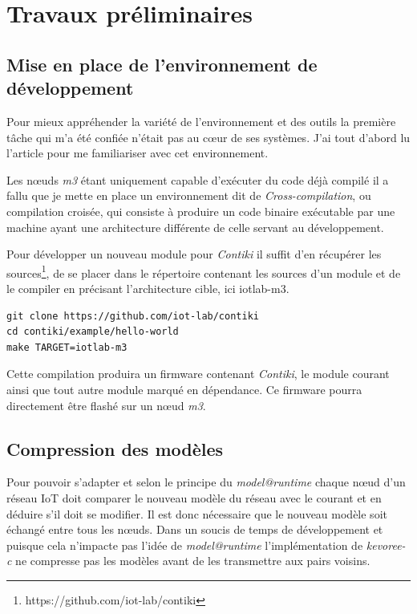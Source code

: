 \section{Travaux préliminaires}
\subsection{Mise en place de l'environnement de développement}
Pour mieux appréhender la variété de l'environnement et des outils la première tâche qui m'a été confiée n'était pas au cœur de ses systèmes. J'ai tout d'abord lu l'article \citep{acostapadilla} pour me familiariser avec cet environnement. 

Les nœuds \emph{m3} étant uniquement capable d'exécuter du code déjà compilé il a fallu que je mette en place un environnement dit de \emph{Cross-compilation}, ou compilation croisée, qui consiste à produire un code binaire exécutable par une machine ayant une architecture différente de celle servant au développement.

Pour développer un nouveau module pour \emph{Contiki} il suffit d'en récupérer les sources\footnote{https://github.com/iot-lab/contiki}, de se placer dans le répertoire contenant les sources d'un module et de le compiler en précisant l'architecture cible, ici iotlab-m3.

\lstset{language=bash, captionpos=b, caption=Résumé des étapes de compilation}
\begin{lstlisting}[frame=single]
git clone https://github.com/iot-lab/contiki
cd contiki/example/hello-world
make TARGET=iotlab-m3
\end{lstlisting}

Cette compilation produira un firmware contenant \emph{Contiki}, le module courant ainsi que tout autre module marqué en dépendance. Ce firmware pourra directement être flashé sur un nœud \emph{m3}.

\subsection{Compression des modèles}

Pour pouvoir s'adapter et selon le principe du \emph{model@runtime} chaque nœud d'un réseau IoT doit comparer le nouveau modèle du réseau avec le courant et en déduire s'il doit se modifier. Il est donc nécessaire que le nouveau modèle soit échangé entre tous les nœuds. Dans un soucis de temps de développement et puisque cela n'impacte pas l'idée de \emph{model@runtime} l'implémentation de \emph{kevoree-c} ne compresse pas les modèles avant de les transmettre aux pairs voisins.

